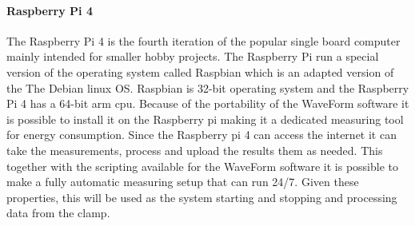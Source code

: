\paragraph*{Raspberry Pi 4}
The Raspberry Pi 4 is the fourth iteration of the popular single board computer mainly intended for smaller hobby projects. The Raspberry Pi run a special version of the operating system called Raspbian which is an adapted version of the The Debian linux OS. Raspbian is 32-bit operating system and the Raspberry Pi 4 has a 64-bit arm cpu. Because of the portability of the WaveForm software it is possible to install it on the Raspberry pi making it a dedicated measuring tool for energy consumption. Since the Raspberry pi 4 can access the internet it can take the measurements, process and  upload the results them as needed. This together with the scripting available for the WaveForm software it is possible to make a fully automatic measuring setup that can run 24/7. Given these properties, this will be used as the system starting and stopping and processing data from the clamp.